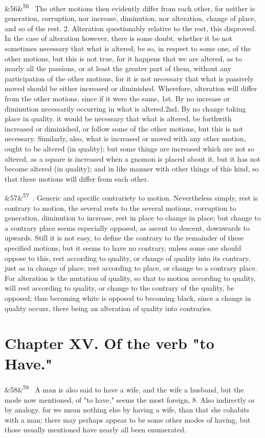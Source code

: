 \documentclass[12pt]{article}
\newcommand{\para}[1][]{\par\noindent\ifx&#1&\else\textsuperscript{\footnotesize #1}~\fi}
\begin{document}
\para[56] The other motions then evidently differ from each other, for neither is generation, corruption, nor increase, diminution, nor alteration, change of place, and so of the rest. 2. Alteration questionably relative to the rest, this disproved. In the case of alteration however, there is some doubt, whether it be not sometimes necessary that what is altered, be so, in respect to some one, of the other motions, but this is not true, for it happens that we are altered, as to nearly all the passions, or at least the greater part of them, without any participation of the other motions, for it is not necessary that what is passively moved should be either increased or diminished. Wherefore, alteration will differ from the other motions, since if it were the same, 1st. By no increase or diminution necessarily occurring in what is altered.2nd, By no change taking place in quality. it would be necessary that what is altered, be forthwith increased or diminished, or follow some of the other motions, but this is not necessary. Similarly, also, what is increased or moved with any other motion, ought to be altered (in quality); but some things are increased which are not so altered, as a square is increased when a gnomon is placed about it, but it has not become altered (in quality); and in like manner with other things of this kind, so that these motions will differ from each other.

\para[57] 3. Generic and specific contrariety to motion. Nevertheless simply, rest is contrary to motion, the several rests to the several motions, corruption to generation, diminution to increase, rest in place to change in place; but change to a contrary place seems especially opposed, as ascent to descent, downwards to upwards. Still it is not easy, to define the contrary to the remainder of these specified motions, but it seems to have no contrary, unless some one should oppose to this, rest according to quality, or change of quality into its contrary, just as in change of place, rest according to place, or change to a contrary place. For alteration is the mutation of quality, so that to motion according to quality, will rest according to quality, or change to the contrary of the quality, be opposed; thus becoming white is opposed to becoming black, since a change in quality occurs, there being an alteration of quality into contraries.

\section*{Chapter XV. Of the verb "to Have."}

\para[58] A man is also said to have a wife, and the wife a husband, but the mode now mentioned, of "to have," seems the most foreign, 8. Also indirectly or by analogy. for we mean nothing else by having a wife, than that she cohabits with a man; there may perhaps appear to be some other modes of having, but those usually mentioned have nearly all been enumerated.
\end{document}
